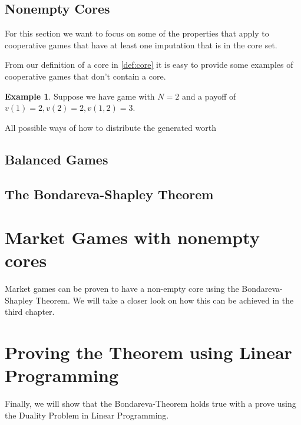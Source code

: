 \documentclass[10pt,a4paper,titlepage]{article}
\theoremstyle{plain}
\theoremstyle{definition}
\newtheorem{exmp}[thm]{Example} %
\begin{document}
 \subsection{Nonempty Cores}
 For this section we want to focus on some of the properties that apply to cooperative games that have at least one imputation that is in the core set.

 From our definition of a core in \ref{def:core} it is easy to provide some examples of cooperative games that don't contain a core.

 \begin{exmp}
    Suppose we have game with $N = 2$ and a payoff of $v(1) = 2, v(2) = 2, v(1, 2) = 3$.

    All possible ways of how to distribute the generated worth

 \end{exmp}
 

 \subsection{Balanced Games}

 \subsection{The Bondareva-Shapley Theorem}

 \section{Market Games with nonempty cores}
 Market games can be proven to have a non-empty core using the Bondareva-Shapley Theorem. We will take a closer look on how this can be achieved in the third chapter.

 \section{Proving the Theorem using Linear Programming}
 Finally, we will show that the Bondareva-Theorem holds true with a prove using the Duality Problem in Linear Programming.
 
\pagebreak
 


\end{document}

